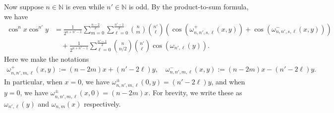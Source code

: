 \documentclass[12pt, reqno]{amsart}
\theoremstyle{plain}
\theoremstyle{definition}
\begin{document}
Now suppose $n\in\mathbb{N}$ is even while $n'\in\mathbb{N}$ is odd. By the product-to-sum formula, we have
\begin{align*}
     \cos^nx\cos^{n'}y&=\frac{1}{2^{n+n'-1}}\sum_{m=0}^{\frac{n-2}{2}}\sum_{\ell=0}^{\frac{n'-1}{2}}\binom{n}{m}\binom{n'}{\ell}(\cos(\omega_{n,n',s, \ell}^+(x, y))+\cos(\omega_{n,n',s, \ell}^-(x, y)))\\
        &\quad+\frac{1}{2^{n+n'-1}}\sum_{\ell=0}^{\frac{n'-1}{2}}\binom{n}{n/2}\binom{n'}{\ell}\cos(\omega_{n',\ell}(y)).
\end{align*}
Here we make the notations
\begin{align*}
    \omega_{n,n',m, \ell}^+(x, y):=(n-2m)x+(n'-2\ell)y,\quad \omega_{n,n',m,\ell}^-(x, y):=(n-2m)x-(n'-2\ell)y.
\end{align*}
In particular, when $x=0$, we have $\omega_{n, n', m, \ell}^{\pm}(0, y)=(n'-2\ell)y$, and when $y=0$, 
we have $\omega_{n,n',m, \ell}^{\pm}(x, 0)=(n-2m)x$. For brevity, we write these as 
$\omega_{n',\ell}(y)$ and $\omega_{n,m}(x)$ respectively. 
\end{document}
